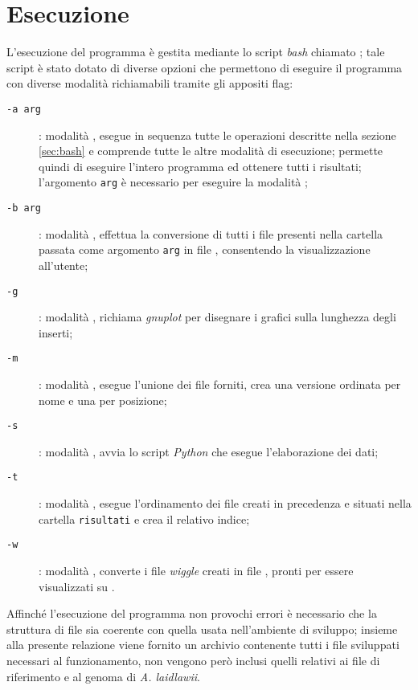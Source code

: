 \section{Esecuzione}
L'esecuzione del programma è gestita mediante lo script \emph{bash} chiamato ; tale script è stato dotato di diverse opzioni che permettono di eseguire il programma con diverse modalità richiamabili tramite gli appositi flag:

\begin{description}
\item[\texttt{-a arg}]: modalità , esegue in sequenza tutte le operazioni descritte nella sezione \ref{sec:bash} e comprende tutte le altre modalità di esecuzione; permette quindi di eseguire l'intero programma ed ottenere tutti i risultati; l'argomento \texttt{arg} è necessario per eseguire la modalità ;
\item[\texttt{-b arg}]: modalità , effettua la conversione di tutti i file  presenti nella cartella passata come argomento \texttt{arg} in file , consentendo la visualizzazione all'utente;
\item[\texttt{-g}]: modalità , richiama \emph{gnuplot} per disegnare i grafici sulla lunghezza degli inserti;
\item[\texttt{-m}]: modalità , esegue l'unione dei file  forniti, crea una versione ordinata per nome e una per posizione;
\item[\texttt{-s}]: modalità , avvia lo script \emph{Python} che esegue l'elaborazione dei dati;
\item[\texttt{-t}]: modalità , esegue l'ordinamento dei file  creati in precedenza e situati nella cartella \texttt{risultati} e crea il relativo indice;
\item[\texttt{-w}]: modalità , converte i file \emph{wiggle} creati in file , pronti per essere visualizzati su .
\end{description}

Affinché l'esecuzione del programma non provochi errori è necessario che la struttura di file sia coerente con quella usata nell'ambiente di sviluppo; insieme alla presente relazione viene fornito un archivio contenente tutti i file sviluppati necessari al funzionamento, non vengono però inclusi quelli relativi ai file  di riferimento e al genoma di \emph{A. laidlawii}.

